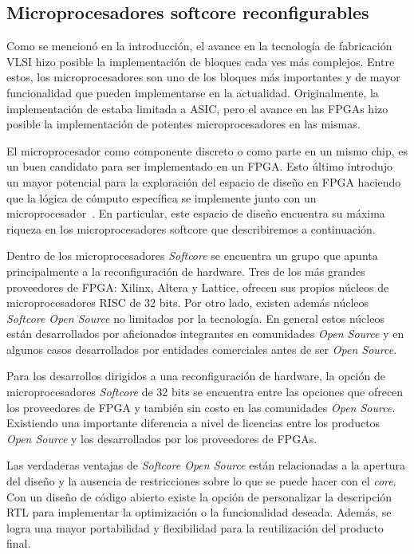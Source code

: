 \subsection{Microprocesadores softcore reconfigurables}

Como se mencionó en la introducción, el avance en la tecnología de
fabricación VLSI hizo posible la implementación de bloques cada ves
más complejos. Entre estos, los microprocesadores son uno de los
bloques más importantes y de mayor funcionalidad que pueden
implementarse en la actualidad. Originalmente, la implementación de estaba limitada a ASIC, pero el avance en las FPGAs hizo
posible la implementación de potentes microprocesadores en las
mismas.

El microprocesador como componente discreto o como parte en un mismo 
chip, es un buen candidato para ser implementado en un FPGA. Esto último introdujo
 un mayor potencial para la exploración
del espacio de diseño en FPGA haciendo que la lógica de cómputo
específica se implemente junto con un
microprocesador~\cite{Etiqueta05}. En particular, este espacio de
diseño encuentra su máxima riqueza en los microprocesadores softcore
que describiremos a continuación.
	
Dentro de los microprocesadores \textit{Softcore} se encuentra un
grupo que apunta principalmente a la reconfiguración de hardware.
Tres de los más grandes proveedores de FPGA: Xilinx, Altera y Lattice,
ofrecen sus propios núcleos de microprocesadores RISC de 32 bits. Por
otro lado, existen además núcleos \textit{Softcore} \textit{Open
  Source} no limitados por la tecnología. En general estos núcleos están
desarrollados por aficionados integrantes en comunidades
\textit{Open Source} y en algunos casos desarrollados por
entidades comerciales antes de ser \textit{Open Source}.
	
Para los desarrollos dirigidos a una reconfiguración de hardware, la
opción de microprocesadores \textit{Softcore} de 32 bits se encuentra
entre las opciones que ofrecen los proveedores de FPGA y también sin costo en las comunidades \textit{Open Source}. Existiendo una importante diferencia a
nivel de licencias entre los productos \textit{Open Source} y los
desarrollados por los proveedores de FPGAs.

Las verdaderas ventajas de \textit{Softcore Open Source} están
relacionadas a la apertura del diseño y la ausencia de restricciones
sobre lo que se puede hacer con el \textit{core}. Con un diseño de
código abierto existe la opción de personalizar la descripción RTL
para implementar la optimización o la funcionalidad deseada. Además,
se logra una mayor portabilidad y flexibilidad para la
reutilización del producto final.


